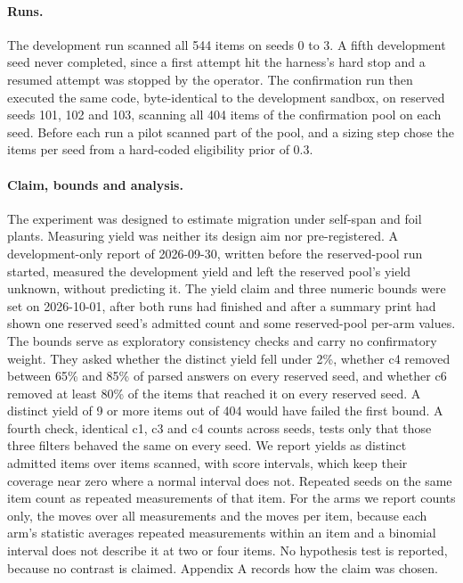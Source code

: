 \documentclass[11pt]{article}
\begin{document}
\paragraph{Runs.} The development run scanned all 544 items on seeds 0 to 3. A fifth development seed never completed, since a first attempt hit the harness's hard stop and a resumed attempt was stopped by the operator. The confirmation run then executed the same code, byte-identical to the development sandbox, on reserved seeds 101, 102 and 103, scanning all 404 items of the confirmation pool on each seed. Before each run a pilot scanned part of the pool, and a sizing step chose the items per seed from a hard-coded eligibility prior of 0.3.

\paragraph{Claim, bounds and analysis.} The experiment was designed to estimate migration under self-span and foil plants. Measuring yield was neither its design aim nor pre-registered. A development-only report of 2026-09-30, written before the reserved-pool run started, measured the development yield and left the reserved pool's yield unknown, without predicting it. The yield claim and three numeric bounds were set on 2026-10-01, after both runs had finished and after a summary print had shown one reserved seed's admitted count and some reserved-pool per-arm values. The bounds serve as exploratory consistency checks and carry no confirmatory weight. They asked whether the distinct yield fell under 2\%, whether c4 removed between 65\% and 85\% of parsed answers on every reserved seed, and whether c6 removed at least 80\% of the items that reached it on every reserved seed. A distinct yield of 9 or more items out of 404 would have failed the first bound. A fourth check, identical c1, c3 and c4 counts across seeds, tests only that those three filters behaved the same on every seed. We report yields as distinct admitted items over items scanned, with \citet{wilson1927probable} score intervals, which keep their coverage near zero where a normal interval does not. Repeated seeds on the same item count as repeated measurements of that item. For the arms we report counts only, the moves over all measurements and the moves per item, because each arm's statistic averages repeated measurements within an item and a binomial interval does not describe it at two or four items. No hypothesis test is reported, because no contrast is claimed. Appendix A records how the claim was chosen.
\end{document}
